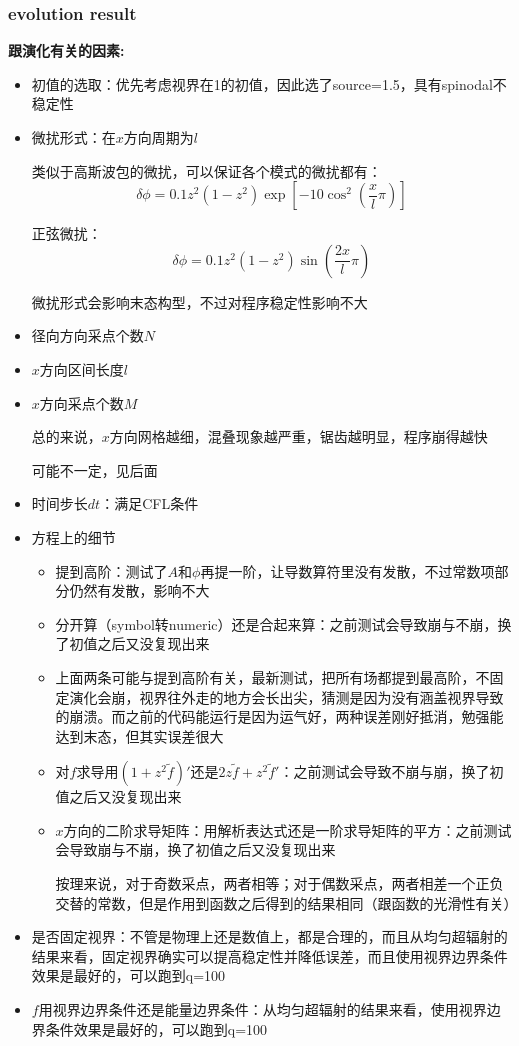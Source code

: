 \documentclass[12pt,a4paper]{ctexart}
\numberwithin{equation}{section}
\begin{document}
\subsubsection{evolution result}

\textbf{跟演化有关的因素:}

\begin{itemize}
    \item 初值的选取：优先考虑视界在1的初值，因此选了source=1.5，具有spinodal不稳定性
    \item 微扰形式：在$x$方向周期为$l$
    
    类似于高斯波包的微扰，可以保证各个模式的微扰都有：
    \begin{equation}
        \delta\phi=0.1z^2(1-z^2)\exp[-10\cos^2(\frac{x}{l}\pi)]
    \end{equation}
    
    正弦微扰：
    \begin{equation}
        \delta\phi=0.1z^2(1-z^2)\sin(\frac{2x}{l}\pi)
    \end{equation}
    
    微扰形式会影响末态构型，不过对程序稳定性影响不大
    \item 径向方向采点个数$N$
    \item $x$方向区间长度$l$
    \item $x$方向采点个数$M$
    
    总的来说，$x$方向网格越细，混叠现象越严重，锯齿越明显，程序崩得越快

    可能不一定，见后面
    \item 时间步长$dt$：满足CFL条件
    \item 方程上的细节
    \begin{itemize}
        \item 提到高阶：测试了$A$和$\phi$再提一阶，让导数算符里没有发散，不过常数项部分仍然有发散，影响不大
        \item 分开算（symbol转numeric）还是合起来算：之前测试会导致崩与不崩，换了初值之后又没复现出来
        \item 上面两条可能与提到高阶有关，最新测试，把所有场都提到最高阶，不固定演化会崩，视界往外走的地方会长出尖，猜测是因为没有涵盖视界导致的崩溃。而之前的代码能运行是因为运气好，两种误差刚好抵消，勉强能达到末态，但其实误差很大
        \item 对$f$求导用$(1+z^2\tilde{f})'$还是$2z\tilde{f}+z^2\tilde{f}'$：之前测试会导致不崩与崩，换了初值之后又没复现出来
        \item $x$方向的二阶求导矩阵：用解析表达式还是一阶求导矩阵的平方：之前测试会导致崩与不崩，换了初值之后又没复现出来
        
        按理来说，对于奇数采点，两者相等；对于偶数采点，两者相差一个正负交替的常数，但是作用到函数之后得到的结果相同（跟函数的光滑性有关）
    \end{itemize}
    \item 是否固定视界：不管是物理上还是数值上，都是合理的，而且从均匀超辐射的结果来看，固定视界确实可以提高稳定性并降低误差，而且使用视界边界条件效果是最好的，可以跑到q=100
    \item $f$用视界边界条件还是能量边界条件：从均匀超辐射的结果来看，使用视界边界条件效果是最好的，可以跑到q=100
\end{itemize}
\end{document}
